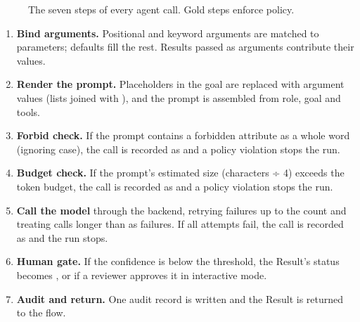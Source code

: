 \begin{figure}[ht]
\centering
{}
\caption{The seven steps of every agent call. Gold steps enforce policy.}
\label{fig:callsteps}
\end{figure}

\begin{enumerate}
  \item \textbf{Bind arguments.} Positional and keyword arguments are matched to parameters; defaults fill the rest. Results passed as arguments contribute their values.
  \item \textbf{Render the prompt.} Placeholders in the goal are replaced with argument values (lists joined with ), and the prompt is assembled from role, goal and tools.
  \item \textbf{Forbid check.} If the prompt contains a forbidden attribute as a whole word (ignoring case), the call is recorded as  and a policy violation stops the run.
  \item \textbf{Budget check.} If the prompt's estimated size (characters ÷ 4) exceeds the token budget, the call is recorded as  and a policy violation stops the run.
  \item \textbf{Call the model} through the backend, retrying failures up to the  count and treating calls longer than  as failures. If all attempts fail, the call is recorded as  and the run stops.
  \item \textbf{Human gate.} If the confidence is below the  threshold, the Result's status becomes , or  if a reviewer approves it in interactive mode.
  \item \textbf{Audit and return.} One audit record is written and the Result is returned to the flow.
\end{enumerate}

